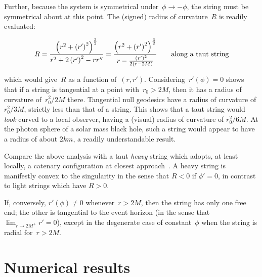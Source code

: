 \documentclass[review]{elsarticle}
\begin{document}
Further, because the system is symmetrical
under~$\phi\longrightarrow-\phi$, the string must be symmetrical about
at this point.  The (signed) radius of curvature~$R$ is readily
evaluated:


\begin{equation}\label{roc}
  R = \frac{
    \left(r^2 + \left(r'\right)^2\right)^\frac{3}{2}
  }{
    r^2 + 2\left(r'\right)^2-rr''
  }
  =
  \frac{
    \left(r^2 + \left(r'\right)^2\right)^\frac{3}{2}
  }{
    r-\frac{\left(r'\right)^2}{2\left(r-2M\right)}
  }\qquad\mbox{along a taut string}
\end{equation}

\noindent which would give~$R$ as a function of~$\left(r,r'\right)$.
Considering~$r'(\phi)=0$ shows that if a string is tangential at a
point with~$r_0>2M$, then it has a radius of curvature of~$r_0^2/2M$
there.  Tangential null geodesics have a radius of curvature of
$r_0^2/3M$, strictly less than that of a string.  This shows that a
taut string would {\em look} curved to a local observer, having a
(visual) radius of curvature of $r_0^2/6M$.  At the photon sphere of a
solar mass black hole, such a string would appear to have a radius of
about $2\unit{km}$, a readily understandable result.

Compare the above analysis with a taut {\em heavy} string which
adopts, at least locally, a catenary configuration at closest
approach~\cite{nguyen2007}.  A heavy string is manifestly convex to
the singularity in the sense that $R<0$ if $\phi'=0$, in contrast to
light strings which have $R>0$.

If, conversely, $r'(\phi)\neq 0$ whenever~$r>2M$, then the string has
only one free end; the other is tangential to the event horizon (in
the sense that ${\displaystyle \lim_{r\longrightarrow 2M^+}r'=0}$),
except in the degenerate case of constant~$\phi$ when the string is
radial for~$r>2M$.

\section{Numerical results}
\end{document}
